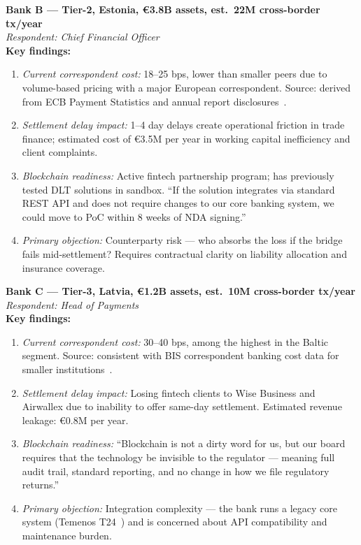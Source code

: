 \documentclass[11pt,a4paper]{article}
\begin{document}
\begin{tcolorbox}[boxbase, colback=white, colframe=accent!30]
\textbf{Bank B --- Tier-2, Estonia, \euro 3.8B assets, est.\ 22M cross-border tx/year}\\[4pt]
\textit{Respondent: Chief Financial Officer}\\[4pt]
\textbf{Key findings:}
\begin{enumerate}[leftmargin=1.5em, itemsep=2pt, parsep=0pt]
\item \textit{Current correspondent cost:} 18--25 bps, lower than smaller peers due to volume-based pricing with a major European correspondent. Source: derived from ECB Payment Statistics and annual report disclosures~\cite{ecb_payments}.
\item \textit{Settlement delay impact:} 1--4 day delays create operational friction in trade finance; estimated cost of \euro 3.5M per year in working capital inefficiency and client complaints.
\item \textit{Blockchain readiness:} Active fintech partnership program; has previously tested DLT solutions in sandbox. ``If the solution integrates via standard REST API and does not require changes to our core banking system, we could move to PoC within 8 weeks of NDA signing.''
\item \textit{Primary objection:} Counterparty risk --- who absorbs the loss if the bridge fails mid-settlement? Requires contractual clarity on liability allocation and insurance coverage.
\end{enumerate}
\end{tcolorbox}

\begin{tcolorbox}[boxbase, colback=white, colframe=accent!30]
\textbf{Bank C --- Tier-3, Latvia, \euro 1.2B assets, est.\ 10M cross-border tx/year}\\[4pt]
\textit{Respondent: Head of Payments}\\[4pt]
\textbf{Key findings:}
\begin{enumerate}[leftmargin=1.5em, itemsep=2pt, parsep=0pt]
\item \textit{Current correspondent cost:} 30--40 bps, among the highest in the Baltic segment. Source: consistent with BIS correspondent banking cost data for smaller institutions~\cite{bis_correspondent}.
\item \textit{Settlement delay impact:} Losing fintech clients to Wise Business and Airwallex due to inability to offer same-day settlement. Estimated revenue leakage: \euro 0.8M per year.
\item \textit{Blockchain readiness:} ``Blockchain is not a dirty word for us, but our board requires that the technology be invisible to the regulator --- meaning full audit trail, standard reporting, and no change in how we file regulatory returns.''
\item \textit{Primary objection:} Integration complexity --- the bank runs a legacy core system (Temenos T24~\cite{temenos_ar}) and is concerned about API compatibility and maintenance burden.
\end{enumerate}
\end{tcolorbox}
\end{document}
